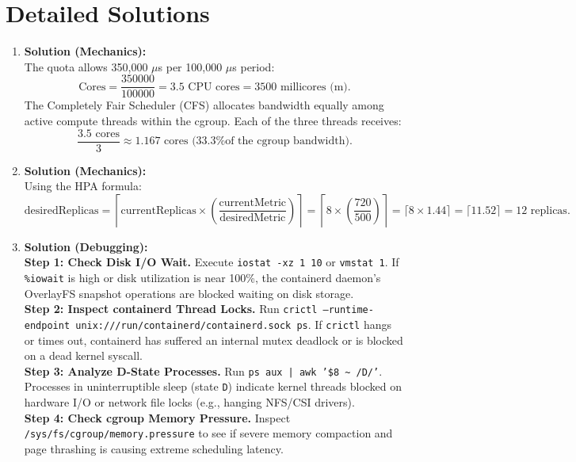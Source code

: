 \section{Detailed Solutions}
\begin{enumerate}[leftmargin=18pt]
  \item \textbf{Solution (Mechanics):}\\
  The quota allows 350,000 $\mu$s per 100,000 $\mu$s period:
  \begin{equation*}
  \text{Cores} = \frac{350000}{100000} = 3.5 \text{ CPU cores} = 3500 \text{ millicores (m)}.
  \end{equation*}
  The Completely Fair Scheduler (CFS) allocates bandwidth equally among active compute threads within the cgroup. Each of the three threads receives:
  \begin{equation*}
  \frac{3.5 \text{ cores}}{3} \approx 1.167 \text{ cores (33.3\% of the cgroup bandwidth)}.
  \end{equation*}

  \item \textbf{Solution (Mechanics):}\\
  Using the HPA formula:
  \begin{equation*}
  \text{desiredReplicas} = \left\lceil \text{currentReplicas} \times \left( \frac{\text{currentMetric}}{\text{desiredMetric}} \right) \right\rceil = \left\lceil 8 \times \left( \frac{720}{500} \right) \right\rceil = \lceil 8 \times 1.44 \rceil = \lceil 11.52 \rceil = 12 \text{ replicas}.
  \end{equation*}

  \item \textbf{Solution (Debugging):}\\
  \textbf{Step 1: Check Disk I/O Wait.} Execute \texttt{iostat -xz 1 10} or \texttt{vmstat 1}. If \texttt{\%iowait} is high or disk utilization is near 100\%, the containerd daemon's OverlayFS snapshot operations are blocked waiting on disk storage.\\
  \textbf{Step 2: Inspect containerd Thread Locks.} Run \texttt{crictl --runtime-endpoint unix:///run/containerd/containerd.sock ps}. If \texttt{crictl} hangs or times out, containerd has suffered an internal mutex deadlock or is blocked on a dead kernel syscall.\\
  \textbf{Step 3: Analyze D-State Processes.} Run \texttt{ps aux | awk '\$8 \textasciitilde{} /D/'}. Processes in uninterruptible sleep (state \texttt{D}) indicate kernel threads blocked on hardware I/O or network file locks (e.g., hanging NFS/CSI drivers).\\
  \textbf{Step 4: Check cgroup Memory Pressure.} Inspect \texttt{/sys/fs/cgroup/memory.pressure} to see if severe memory compaction and page thrashing is causing extreme scheduling latency.


\end{enumerate}
